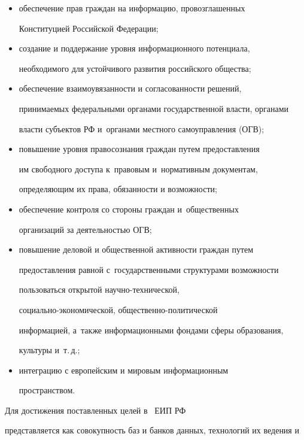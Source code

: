 \begin{itemize}

\item  обеспечение прав граждан на информацию, провозглашенных

Конституцией Российской Федерации;

     \item создание и поддержание уровня информационного потенциала,

необходимого для устойчивого развития российского общества;

     \item обеспечение взаимоувязанности и согласованности решений,

принимаемых федеральными органами государственной власти, органами

власти субъектов РФ и~органами местного самоуправления (ОГВ);

     \item повышение уровня правосознания граждан путем предо\-став\-ления

им свободного доступа к~правовым и~нормативным документам,

определяющим их права, обязанности и возможности;

     \item обеспечение контроля со стороны граждан и~общественных

организаций за деятельностью ОГВ;

     \item повышение деловой и общественной активности граждан путем

предо\-став\-ления равной с~государственными структурами возможности

пользоваться открытой на\-уч\-но-тех\-ни\-че\-ской,

     со\-ци\-аль\-но-эко\-но\-ми\-че\-ской, об\-щест\-вен\-но-по\-ли\-ти\-че\-ской

     информацией, а~также информационными фондами сферы образования,

культуры и~т.\,д.;

     \item интеграцию с европейским и мировым информационным

пространством.

     \end{itemize}



     Для достижения поставленных целей в~\cite{1-zk} ЕИП РФ

представляется как совокупность баз и банков данных, технологий их ведения и

